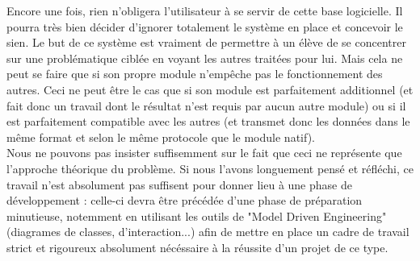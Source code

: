 		Encore une fois, rien n'obligera l'utilisateur à se servir de cette base logicielle. Il pourra très bien décider d'ignorer totalement le système en place et concevoir le sien. Le but de ce système est vraiment de permettre à un élève de se concentrer sur une problématique ciblée en voyant les autres traitées pour lui. Mais cela ne peut se faire que si son propre module n'empêche pas le fonctionnement des autres. Ceci ne peut être le cas que si son module est parfaitement additionnel (et fait donc un travail dont le résultat n'est requis par aucun autre module) ou si il est parfaitement compatible avec les autres (et transmet donc les données dans le même format et selon le même protocole que le module natif).\\

		Nous ne pouvons pas insister suffisemment sur le fait que ceci ne représente que l'approche théorique du problème. Si nous l'avons longuement pensé et réfléchi, ce travail n'est absolument pas suffisent pour donner lieu à une phase de développement : celle-ci devra être précédée d'une phase de préparation minutieuse, notemment en utilisant les outils de "Model Driven Engineering" (diagrames de classes, d'interaction...) afin de mettre en place un cadre de travail strict et rigoureux absolument nécéssaire à la réussite d'un projet de ce type.